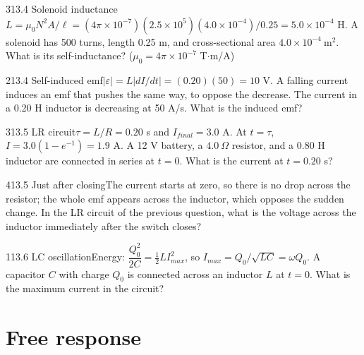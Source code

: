\documentclass[11pt]{article}
\begin{document}
\begin{q}{3}{13.4 Solenoid inductance}{$L = \mu_0N^2A/\ell = (4\pi\times10^{-7})(2.5\times10^5)(4.0\times10^{-4})/0.25 = 5.0\times10^{-4}$ H.}
A solenoid has 500 turns, length 0.25 m, and cross-sectional area $4.0\times10^{-4}\ \mathrm{m^2}$. What is its self-inductance? ($\mu_0 = 4\pi\times10^{-7}$ T$\cdot$m/A)
\end{q}
\begin{q}{2}{13.4 Self-induced emf}{$|\varepsilon| = L|dI/dt| = (0.20)(50) = 10$ V. A falling current induces an emf that pushes the same way, to oppose the decrease.}
The current in a 0.20 H inductor is decreasing at 50 A/s. What is the induced emf?
\end{q}
\begin{q}{3}{13.5 LR circuit}{$\tau = L/R = 0.20$ s and $I_{final} = 3.0$ A. At $t = \tau$, $I = 3.0(1 - e^{-1}) = 1.9$ A.}
A 12 V battery, a $4.0\ \Omega$ resistor, and a 0.80 H inductor are connected in series at $t = 0$. What is the current at $t = 0.20$ s?
\end{q}
\begin{q}{4}{13.5 Just after closing}{The current starts at zero, so there is no drop across the resistor; the whole emf appears across the inductor, which opposes the sudden change.}
In the LR circuit of the previous question, what is the voltage across the inductor immediately after the switch closes?
\end{q}
\begin{q}{1}{13.6 LC oscillation}{Energy: $\dfrac{Q_0^2}{2C} = \tfrac12 LI_{max}^2$, so $I_{max} = Q_0/\sqrt{LC} = \omega Q_0$.}
A capacitor $C$ with charge $Q_0$ is connected across an inductor $L$ at $t = 0$. What is the maximum current in the circuit?
\end{q}

\section{Free response}
\end{document}
